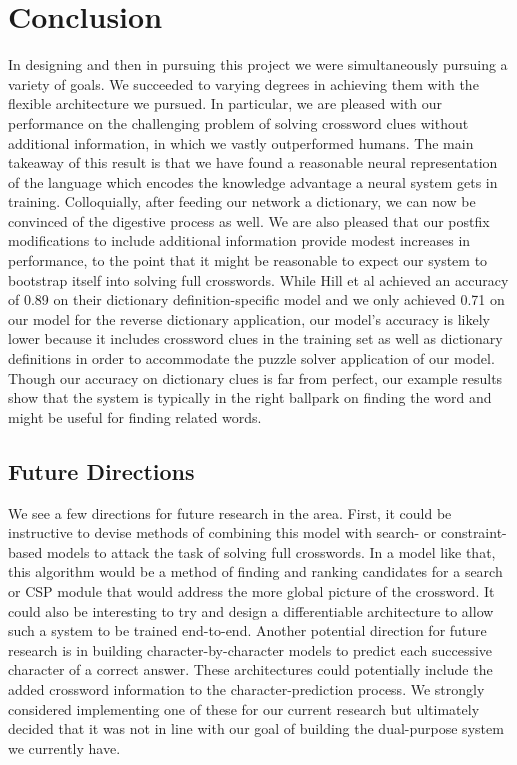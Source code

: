 \documentclass{article} %
\begin{document}
\section{Conclusion}
In designing and then in pursuing this project we were simultaneously pursuing a variety of goals. We succeeded to varying degrees in achieving them with the flexible architecture we pursued. In particular, we are pleased with our performance on the challenging problem of solving crossword clues without additional information, in which we vastly outperformed humans. The main takeaway of this result is that we have found a reasonable neural representation of the language which encodes the knowledge advantage a neural system gets in training. Colloquially, after feeding our network a dictionary, we can now be convinced of the digestive process as well.
We are also pleased that our postfix modifications to include additional information provide modest increases in performance, to the point that it might be reasonable to expect our system to bootstrap itself into solving full crosswords. 
While Hill et al achieved an accuracy of 0.89 on their dictionary definition-specific model and we only achieved 0.71 on our model for the reverse dictionary application, our model’s accuracy is likely lower because it includes crossword clues in the training set as well as dictionary definitions in order to accommodate the puzzle solver application of our model. Though our accuracy on dictionary clues is far from perfect, our example results show that the system is typically in the right ballpark on finding the word and might be useful for finding related words. 

\subsection{Future Directions}
We see a few directions for future research in the area. First, it could be instructive to devise methods of combining this model with search- or constraint-based models to attack the task of solving full crosswords. In a model like that, this algorithm would be a method of finding and ranking candidates for a search or CSP module that would address the more global picture of the crossword. It could also be interesting to try and design a differentiable architecture to allow such a system to be trained end-to-end.
Another potential direction for future research is in building character-by-character models to  predict each successive character of  a correct answer. These architectures could potentially include the added crossword information to the character-prediction process. We strongly considered implementing one of these for our current research but ultimately decided that it was not in line with our goal of building the dual-purpose system we currently have.
\end{document}
